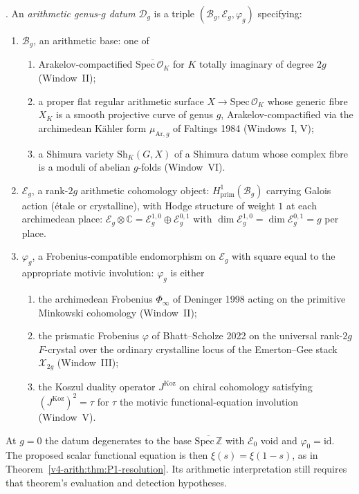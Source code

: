 \begin{definition}
\label{v4-arith:ag:defn:datum}
\ClaimStatusDefinitional.
An \emph{arithmetic genus-\(g\) datum} \(\mathcal{D}_g\) is a triple
\((\mathcal{B}_g,\mathcal{E}_g,\varphi_g)\) specifying:
\begin{enumerate}
\item \(\mathcal{B}_g\), an arithmetic base: one of
\begin{enumerate}
\item Arakelov-compactified \(\overline{\mathrm{Spec}\,\mathcal{O}_K}\) for
\(K\) totally imaginary of degree \(2g\) (Window~II);
\item a proper flat regular arithmetic surface \(X\to\mathrm{Spec}\,\mathcal{O}_K\)
whose generic fibre \(X_K\) is a smooth projective curve of genus \(g\),
Arakelov-compactified via the archimedean Kähler form
\(\mu_{\mathrm{Ar},g}\) of Faltings 1984 (Windows~I, V);
\item a Shimura variety \(\mathrm{Sh}_K(G,X)\) of a Shimura datum whose
complex fibre is a moduli of abelian \(g\)-folds (Window~VI).
\end{enumerate}
\item \(\mathcal{E}_g\), a rank-\(2g\) arithmetic cohomology object:
\(H^{1}_{\mathrm{prim}}(\mathcal{B}_g)\) carrying Galois action (étale or
crystalline), with Hodge structure of weight \(1\) at each archimedean place:
\(\mathcal{E}_g\otimes\mathbb{C}=\mathcal{E}_g^{1,0}\oplus\mathcal{E}_g^{0,1}\)
with \(\dim\mathcal{E}_g^{1,0}=\dim\mathcal{E}_g^{0,1}=g\) per place.
\item \(\varphi_g\), a Frobenius-compatible endomorphism on \(\mathcal{E}_g\)
with square equal to the appropriate motivic involution: \(\varphi_g\) is
either
\begin{enumerate}
\item the archimedean Frobenius \(\Phi_\infty\) of Deninger 1998 acting on
the primitive Minkowski cohomology (Window~II);
\item the prismatic Frobenius \(\varphi\) of Bhatt--Scholze 2022 on the
universal rank-\(2g\) \(F\)-crystal over the ordinary crystalline locus of the
Emerton--Gee stack \(\mathcal{X}_{2g}\) (Window~III);
\item the Koszul duality operator \(J^{\mathrm{Koz}}\) on chiral cohomology
satisfying \((J^{\mathrm{Koz}})^{2}=\tau\) for \(\tau\) the motivic
functional-equation involution (Window~V).
\end{enumerate}
\end{enumerate}
At \(g=0\) the datum degenerates to the base \(\overline{\mathrm{Spec}\,\mathbb{Z}}\)
with \(\mathcal E_0\) void and \(\varphi_0=\mathrm{id}\).
The proposed scalar functional equation is then \(\xi(s)=\xi(1-s)\),
as in Theorem~\ref{v4-arith:thm:P1-resolution}. Its arithmetic interpretation
still requires that theorem's evaluation and detection hypotheses.
\end{definition}

